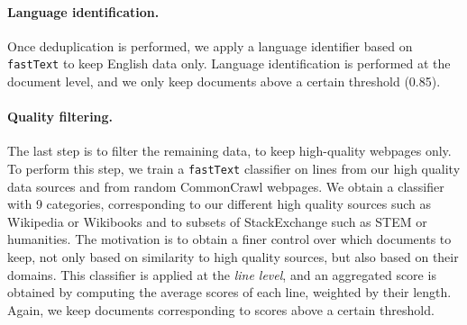 \paragraph{Language identification.}
Once deduplication is performed, we apply a language identifier based on \texttt{fastText} to keep English data only.
Language identification is performed at the document level, and we only keep documents above a certain threshold (0.85).

\paragraph{Quality filtering.}
The last step is to filter the remaining data, to keep high-quality webpages only.
To perform this step, we train a \texttt{fastText} classifier on lines from our high quality data sources and from random CommonCrawl webpages.
We obtain a classifier with 9 categories, corresponding to our different high quality sources such as Wikipedia or Wikibooks and to subsets of StackExchange such as STEM or humanities.
The motivation is to obtain a finer control over which documents to keep, not only based on similarity to high quality sources, but also based on their domains.
This classifier is applied at the \emph{line level}, and an aggregated score is obtained by computing the average scores of each line, weighted by their length.
Again, we keep documents corresponding to scores above a certain threshold.




